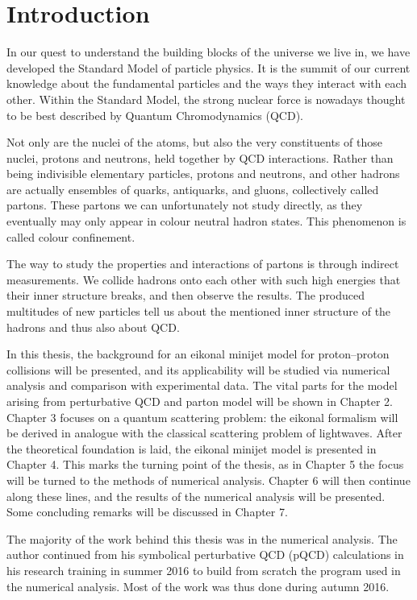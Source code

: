 \documentclass[a4paper, twoside, english, 12pt]{report}
\begin{document}
\chapter{Introduction}\label{S:Intro}

In our quest to understand the building blocks of the universe we live in, we have developed the Standard Model of particle physics. It is the summit of our current knowledge about the fundamental particles and the ways they interact with each other. Within the Standard Model, the strong nuclear force is nowadays thought to be best described by Quantum Chromodynamics (QCD). 

Not only are the nuclei of the atoms, but also the very constituents of those nuclei, protons and neutrons, held together by QCD interactions. Rather than being indivisible elementary particles, protons and neutrons, and other hadrons are actually ensembles of quarks, antiquarks, and gluons, collectively called partons. These partons we can unfortunately not study directly, as they eventually may only appear in colour neutral hadron states. This phenomenon is called colour confinement.

The way to study the properties and interactions of partons is through indirect measurements. We collide hadrons onto each other with such high energies that their inner structure breaks, and then observe the results. The produced multitudes of new particles tell us about the mentioned inner structure of the hadrons and thus also about QCD.

In this thesis, the background for an eikonal minijet model for proton--proton collisions will be presented, and its applicability will be studied via numerical analysis and comparison with experimental data. The vital parts for the model arising from perturbative QCD and parton model will be shown in Chapter 2. Chapter 3 focuses on a quantum scattering problem: the eikonal formalism will be derived in analogue with the classical scattering problem of lightwaves. After the theoretical foundation is laid, the eikonal minijet model is presented in Chapter 4. This marks the turning point of the thesis, as in Chapter 5 the focus will be turned to the methods of numerical analysis. Chapter 6 will then continue along these lines, and the results of the numerical analysis will be presented. Some concluding remarks will be discussed in Chapter 7. 

The majority of the work behind this thesis was in the numerical analysis. The author continued from his symbolical perturbative QCD (pQCD) calculations in his research training in summer 2016 to build from scratch the program used in the numerical analysis. Most of the work was thus done during autumn 2016.
\end{document}
